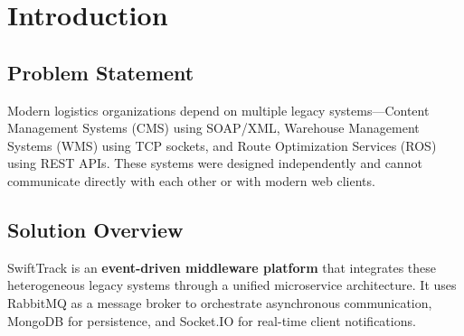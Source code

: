 \documentclass[12pt,a4paper]{article}
\begin{document}
\thispagestyle{empty}
\begin{abstract}
This document presents the design and implementation of \textbf{SwiftTrack}, a middleware solution for Swift Logistics (Pvt) Ltd. that integrates three heterogeneous legacy systems: a SOAP/XML-based Client Management System (CMS), a RESTful Route Optimisation System (ROS), and a TCP/IP-based Warehouse Management System (WMS). The proposed architecture employs a microservices-based approach with RabbitMQ as the central message broker for asynchronous, event-driven communication. Key architectural contributions include an orchestration-based Saga pattern for distributed transaction management with compensating transactions, a lightweight service discovery registry with health-check monitoring, real-time WebSocket notifications via Socket.IO, and a comprehensive security layer with JWT authentication, Helmet.js, and rate limiting. The prototype demonstrates a complete order processing pipeline from client submission through CMS inventory verification, ROS route optimisation, and WMS driver assignment, with real-time status updates delivered to a pure HTML/CSS/JavaScript client portal. Two alternative architectures (ESB-centric and serverless) are evaluated and compared against the selected approach.
\end{abstract}

\newpage
\tableofcontents
\listoffigures
\listoftables
\newpage


\section{Introduction}

\subsection{Problem Statement}
Modern logistics organizations depend on multiple legacy systems—Content Management Systems (CMS) using SOAP/XML, Warehouse Management Systems (WMS) using TCP sockets, and Route Optimization Services (ROS) using REST APIs. These systems were designed independently and cannot communicate directly with each other or with modern web clients.

\subsection{Solution Overview}
SwiftTrack is an \textbf{event-driven middleware platform} that integrates these heterogeneous legacy systems through a unified microservice architecture. It uses RabbitMQ as a message broker to orchestrate asynchronous communication, MongoDB for persistence, and Socket.IO for real-time client notifications.
\end{document}
